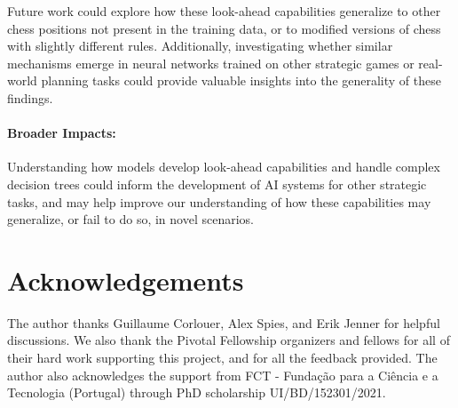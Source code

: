 \documentclass{article}
\begin{document}
Future work could explore how these look-ahead capabilities generalize to other chess positions not present in the training data, or to modified versions of chess with slightly different rules. Additionally, investigating whether similar mechanisms emerge in neural networks trained on other strategic games or real-world planning tasks could provide valuable insights into the generality of these findings.

\paragraph{Broader Impacts:} Understanding how models develop look-ahead capabilities and handle complex decision trees could inform the development of AI systems for other strategic tasks, and may help improve our understanding of how these capabilities may generalize, or fail to do so, in novel scenarios.



\section*{Acknowledgements}
The author thanks Guillaume Corlouer, Alex Spies, and Erik Jenner for helpful discussions. We also thank the Pivotal Fellowship organizers and fellows for all of their hard work supporting this project, and for all the feedback provided. The author also acknowledges the support from FCT - Funda\c{c}\~{a}o para a Ci\^{e}ncia e a Tecnologia (Portugal) through PhD scholarship UI/BD/152301/2021.



\end{document}
